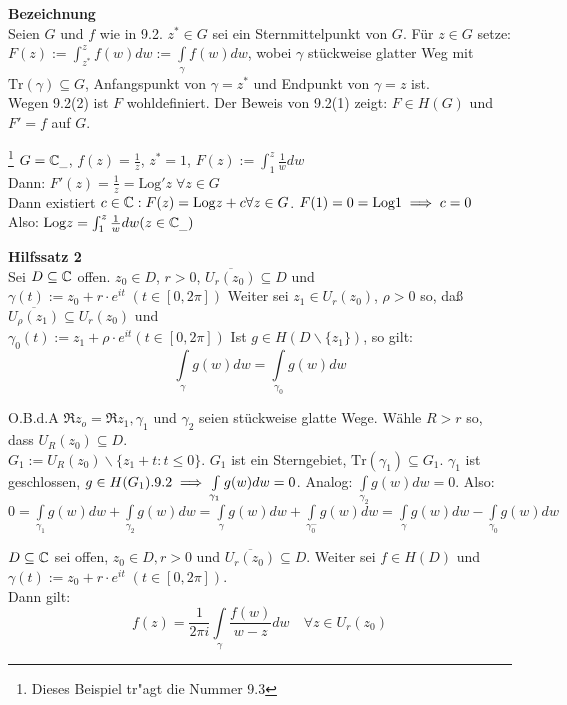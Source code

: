 \documentclass[a4paper,twoside,DIV15,BCOR12mm]{scrbook}
\def\Log{\text{Log}}
\def\Tr{\text{Tr}}
\def\wegint{\ensuremath{\int\limits_\gamma}}
\begin{document}
\textbf{Bezeichnung} \\
Seien $G$ und $f$ wie in 9.2. $z^* \in G$ sei ein Sternmittelpunkt von $G$. Für $z \in G$ setze: $F(z) := \int_{z^*}^{z} f(w) dw := \wegint f(w) dw$, wobei $\gamma$  stückweise glatter Weg mit $\Tr(\gamma) \subseteq G$, Anfangspunkt von $\gamma = z^*$ und Endpunkt von $\gamma = z$ ist.\\ Wegen 9.2(2) ist $F$ wohldefiniert. Der Beweis von 9.2(1) zeigt: $F \in H(G)$ und $F'=f$ auf $G$.
\begin{beispiel}\footnote{Dieses Beispiel tr"agt die Nummer 9.3}
$G = \mathbb{C}_{\_}$, $f(z) = \frac{1}{z}$, $z^* = 1$,
$F(z) := \int_{1}^{z} \frac{1}{w} dw$ \\
Dann: $F'(z) = \frac{1}{z} = \Log ' z \; \forall z \in G$ \\
Dann existiert $c \in \MdC : F(z) = \Log z + c \forall z \in G$. $F(1) = 0 = \Log 1 \folgt c = 0$\\
Also: $\Log z = \int_{1}^{z} \frac{1}{w} dw (z \in \MdC_{\_})$
\end{beispiel}
\textbf{Hilfssatz 2} \\
Sei $D \subseteq \mathbb{C}$ offen. $z_0 \in D$, $r > 0$, $ \overline{U_r (z_0)} \subseteq D$ und $\gamma(t) := z_0 + r \cdot e^{it} \; (t \in [0,2\pi])$
Weiter sei $z_1 \in U_r (z_0)$, $\rho > 0$ so, daß $\overline{U_{\rho} (z_1)} \subseteq U_r (z_0)$ und \\
$\gamma_0 (t) := z_1 + \rho \cdot e^{it} (t \in [0,2\pi])$
Ist $g \in H (D\backslash \{z_1\})$, so gilt: 
$$\wegint g(w) dw = \int\limits_{\gamma _0} g(w) dw$$
\begin{beweis}
O.B.d.A $\Re z_o = \Re z_1, \gamma _1$ und $\gamma _2$ seien stückweise glatte Wege. Wähle $R > r$ so, dass $U_R(z_0) \subseteq D$. \\
$G_1 := U_R(z_0) \backslash \{z_1 + t : t \leq 0\}$. $G_1$ ist ein Sterngebiet, $\Tr (\gamma _1) \subseteq G_1$. $\gamma _1$ ist geschlossen, $g \in H(G_1). 9.2 \implies \int\limits _{\gamma _1} g(w) dw = 0$. Analog: $\int\limits _{\gamma _2} g(w) dw = 0$. Also:\\
$0 = \int\limits _{\gamma _1} g(w) dw + \int\limits _{\gamma _2} g(w) dw = \int\limits _{\gamma} g(w) dw + \int\limits _{\gamma _0^-} g(w) dw = \int\limits _{\gamma} g(w) dw - \int\limits _{\gamma _0} g(w) dw$
\end{beweis}

\setcounter{satz}{3}
\begin{satz}
$D\subseteq \mathbb{C}$ sei offen, $z_0 \in D, r>0$ und $\overline{U_r(z_0)} \subseteq D$. Weiter sei $f \in H(D)$ und $\gamma (t) := z_0 + r\cdot e^{it} \; (t \in [0,2\pi ])$.\\
Dann gilt:
$$f(z) = \frac{1}{2\pi i}\wegint\frac{f(w)}{w-z}dw\quad\forall z\in U_r(z_0)$$
\end{satz}
\end{document}
